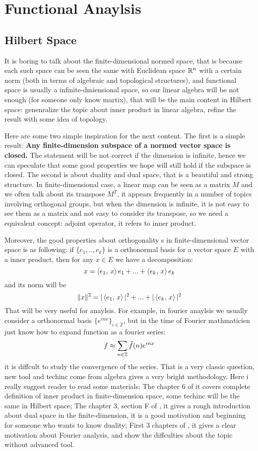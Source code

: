 \documentclass[en,geye,blue,normal,12pt,bibend=bibtex]{elegantnote}
\begin{document}
\newpage
\section{Functional Anaylsis}

\subsection{Hilbert Space}
It is boring to talk about the finite-dimensional normed space, that is because each such space can be seen the same with Euclidean space \(\mathbb{R}^n\) with a certain norm (both in terms of algebraic and topological structures), and functional space is usually a infinite-dmiensional space, so our linear algebra will be not enough (for someone only know martix), that will be the main content in Hilbert space: genenralize the topic about inner product in linear algebra, refine the result with some idea of topology.

Here are some two simple inspiration for the next content. The first is a simple result: \textbf{Any finite-dimension subspace of a normed vector space is closed.} The statement will be not correct if the dimension is infinite, hence we can speculate that some good properties we hope will still hold if the subspace is closed. The second is about duality and dual space, that is a beautiful and strong structure. In finite-dimensional case, a linear map can be seen as a matrix \(M\) and we often talk about its transpose \(M^T\), it appears frequently in a number of topics involving orthogonal groups, but when the dimension is infinite, it is not easy to see them as a matrix and not easy to consider its transpose, so we need a equivalent concept: adjoint operator, it refers to inner product.

Moreover, the good properties about orthogonality s in finite-dimensional vector space is as following: if \(\{e_1,..,e_k\}\) is a orthonormal basis for a vector space \(E\) with a inner product, then for any \(x \in E\) we have a decomposition:
\[x= \left\langle e_1,\, x \right\rangle e_1+...+\left\langle e_k,\, x \right\rangle e_k\]
and its norm will be
\[\|x\|^2 = |\left\langle e_1,\, x \right\rangle|^2+...+|\left\langle e_k,\, x \right\rangle|^2\]
That will be very useful for anaylsis. For example, in fourier anaylsis we usually consider a orthonormal basis \(\{e^{inx}\}_{i \in \mathbb{Z}}\), but in the time of Fourier mathmaticien just know how to expand function as a fourier series:
\[f \approx \sum_{n \in \mathbb{Z}} \hat{f}(n) e^{inx} \]
it is diffcult to study the convergence of the series. That is a very classic question, new tool and techinc come from algebra gives a very bright methodology. Here i really suggest reader to read some materials: The chapter 6 of \cite{axler2024linear} it covers complete definition of inner product in finite-dimension space, some techinc will be the same in Hilbert space; The chapter 3, section F of \cite{axler2024linear}, it gives a rough introduction about dual space in the finite-dimension, it is a good motivation and beginning for someone who wants to know duality; First 3 chapters of \cite{stein2011fourier}, it gives a clear motivation about Fourier analysis, and show the diffculties about the topic without advanced tool.
\end{document}
